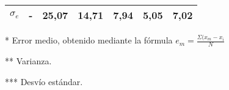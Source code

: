 \begin{table}[]
\begin{threeparttable}[b]
\begin{tabular}{ccccccc}
           $\sigma_{e}$ \tnote{***}   & -  & 25,07  & 14,71  & 7,94  & 5,05  & 7,02  \\ \hline \hline
        \end{tabular}
        \begin{tablenotes}
        \footnotesize{
                \item [*]Error medio, obtenido mediante la fórmula $e_{m}=\frac{\Sigma(x_{m}-x_i}{N}$
                \item [**]Varianza.
                \item [***] Desvío estándar.
                }
        \end{tablenotes}
  \end{threeparttable}
\end{table}
       